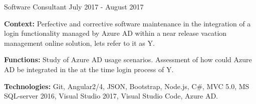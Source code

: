 \begin{cventries}
  \cventry
    {Software Consultant} %
    {} %
    {} %
    {July 2017 - August 2017} %
    {
      \begin{cvitems} %
		\item {\textbf{Context:} Perfective and corrective software maintenance in the integration of a login functionality managed by Azure AD within a near release vacation management online solution, lets refer to it as Y.}
		\item {\textbf{Functions:} Study of Azure AD usage scenarios. Assessment of how could Azure AD be integrated in the at the time login process of Y.}		
		\item {\textbf{Technologies:} Git, Angular2/4, JSON, Bootstrap, Node.js, C\#, MVC 5.0, MS SQL-server 2016, Visual Studio 2017, Visual Studio Code, Azure AD.}
      \end{cvitems}
    }   


\end{cventries}
